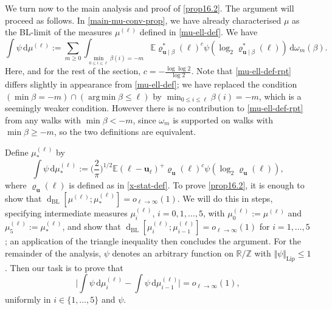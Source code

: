 \documentclass[11pt,reqno]{amsart}
\DeclareMathOperator*{\argmin}{arg\,min}
\numberwithin{equation}{section}
\theoremstyle{definition}
\theoremstyle{remark}
\newcommand{\mb}{\mathbb}
\newcommand{\mbf}{\mathbf}
\newcommand{\dist}[2]{{\operatorname{d}_{\operatorname{BL}}[#1;#2]}}
\renewcommand{\le}{\leqslant}
\renewcommand{\ge}{\geqslant}
\newcommand\Z{\mathbb{Z}}
\newcommand\R{\mathbb{R}}
\newcommand\Lip{\operatorname{Lip}}
\begin{document}
We turn now to the main analysis and proof of \cref{prop16.2}. The argument will proceed as follows. In \cref{main-mu-conv-prop}, we have already characterised $\mu$ as the BL-limit of the measures $\mu^{(\ell)}$ defined in \cref{mu-ell-def}. We have
\begin{equation}\label{mu-ell-def-rpt} \int \psi \, \mathrm{d} \mu^{(\ell)} := \sum_{m \ge 0}\int_{\min_{0 \le i \le \ell} \beta(i) = -m} \mb{E} \varrho^*_{\mbf{u} \mid \beta}(\ell)^c \psi (\log_2 \varrho^*_{\mbf{u} \mid \beta}(\ell)) \, \mathrm{d}\omega_m(\beta).\end{equation} 
Here, and for the rest of the section, $c = -\frac{\log \log 2}{\log 2}$. Note that \cref{mu-ell-def-rpt} differs slightly in appearance from \cref{mu-ell-def}; we have replaced the condition $(\min \beta = -m) \cap (\argmin \beta \le \ell)$ by $\min_{0 \le i \le \ell} \beta(i) = -m$, which is a seemingly weaker condition. However there is no contribution to \cref{mu-ell-def-rpt} from any walks with $\min \beta < -m$, since $\omega_m$ is supported on walks with $\min \beta \ge -m$, so the two definitions are equivalent.

Define $\mu^{(\ell)}_*$ by
\begin{equation}\label{mu-ell-star-def} \int \psi \, \mathrm{d}\mu^{(\ell)}_* :=  \big(\frac{2}{\pi}\big)^{1/2}\mb{E} (\ell - \mbf{u}_{\ell})^+\varrho_{\mbf{u}}(\ell)^c \psi(\log_2 \varrho_{\mbf{u}}(\ell)),\end{equation} where $\varrho_{\mbf{u}}(\ell)$ is defined as in \cref{x-stat-def}. To prove \cref{prop16.2}, it is enough to show that $\dist{\mu^{(\ell)}}{\mu^{(\ell)}_{*}} = o_{\ell \rightarrow \infty}(1)$. We will do this in steps, specifying intermediate measures $\mu_i^{(\ell)}$, $i = 0,1,\dots, 5$, with $\mu_0^{(\ell)} := \mu^{(\ell)}$ and $\mu_5^{(\ell)} := \mu_{*}^{(\ell)}$, and show that $\dist{\mu^{(\ell)}_{i}}{\mu^{(\ell)}_{i -1}} = o_{\ell \rightarrow \infty}(1)$ for $i = 1,\dots, 5$; an application of the triangle inequality then concludes the argument. For the remainder of the analysis, $\psi$ denotes an arbitrary function on $\R/\Z$ with $\Vert \psi \Vert_{\Lip} \le 1$. Then our task is to prove that 
\begin{equation}\label{mu-mu-circ-close}  \big| \int \psi \, \mathrm{d}\mu_i^{(\ell)} - \int \psi \, \mathrm{d}\mu_{i-1}^{(\ell)}\big| = o_{\ell \rightarrow \infty}(1),\end{equation} uniformly in $i \in \{1,\dots, 5\}$ and $\psi$.\vspace*{10pt}
\end{document}
